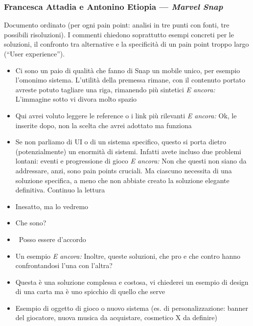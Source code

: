 \subsubsection{Francesca Attadia e Antonino Etiopia --- \emph{Marvel Snap}}
Documento ordinato (per ogni pain point: analisi in tre punti con fonti,
tre possibili risoluzioni). I commenti chiedono soprattutto esempi concreti
per le soluzioni, il confronto tra alternative e la specificità di un pain
point troppo largo (``User experience'').
{\small
\begin{itemize}
  \item {} Ci sono un paio di qualità che fanno di Snap un mobile unico, per esempio l'omonimo sistema. L'utilità della premessa rimane, con il contenuto portato avreste potuto tagliare una riga, rimanendo più sintetici \emph{E ancora:} L'immagine sotto vi divora molto spazio
  \item {} Qui avrei voluto leggere le reference o i link più rilevanti \emph{E ancora:} Ok, le inserite dopo, non la scelta che avrei adottato ma funziona
  \item {} Se non parliamo di UI o di un sistema specifico, questo si porta dietro (potenzialmente) un enormità di sistemi. Infatti avete incluso due problemi lontani: eventi e progressione di gioco \emph{E ancora:} Non che questi non siano da addressare, anzi, sono pain points cruciali. Ma ciascuno necessita di una soluzione specifica, a meno che non abbiate creato la soluzione elegante definitiva. Continuo la lettura
  \item {} Inesatto, ma lo vedremo
  \item {} Che sono?
  \item {} \rvBene\ Posso essere d'accordo
  \item {} Un esempio \emph{E ancora:} Inoltre, queste soluzioni, che pro e che contro hanno confrontandosi l'una con l'altra?
  \item {} Questa è una soluzione complessa e costosa, vi chiederei un esempio di design di una carta ma è uno spicchio di quello che serve
  \item {} Esempio di oggetto di gioco o nuovo sistema (es. di personalizzazione: banner del giocatore, nuova musica da acquistare, cosmetico X da definire)

\end{itemize}}
